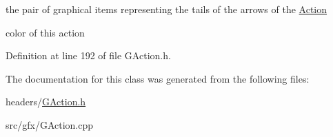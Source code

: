 the pair of graphical items representing the tails of the arrows of the \hyperlink{classAction}{Action} 

color of this action 

Definition at line 192 of file G\+Action.\+h.



The documentation for this class was generated from the following files\+:\begin{DoxyCompactItemize}
\item 
headers/\hyperlink{GAction_8h}{G\+Action.\+h}\item 
src/gfx/G\+Action.\+cpp\end{DoxyCompactItemize}
